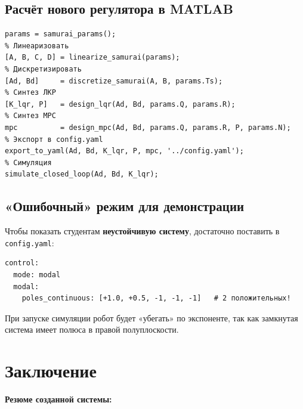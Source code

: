 \subsection{Расчёт нового регулятора в MATLAB}

\begin{filebox}[title={\filepath{matlab/main.m} --- сценарий}]
\begin{lstlisting}[style=matlabstyle]
% Загрузить параметры объекта
params = samurai_params();
% Линеаризовать
[A, B, C, D] = linearize_samurai(params);
% Дискретизировать
[Ad, Bd]     = discretize_samurai(A, B, params.Ts);
% Синтез ЛКР
[K_lqr, P]   = design_lqr(Ad, Bd, params.Q, params.R);
% Синтез MPC
mpc          = design_mpc(Ad, Bd, params.Q, params.R, P, params.N);
% Экспорт в config.yaml
export_to_yaml(Ad, Bd, K_lqr, P, mpc, '../config.yaml');
% Симуляция
simulate_closed_loop(Ad, Bd, K_lqr);
\end{lstlisting}
\end{filebox}

\subsection{«Ошибочный» режим для демонстрации}

Чтобы показать студентам \textbf{неустойчивую систему}, достаточно
поставить в \texttt{config.yaml}:
\begin{filebox}[title={Демонстрация неустойчивости}]
\begin{lstlisting}[basicstyle=\small\ttfamily]
control:
  mode: modal
  modal:
    poles_continuous: [+1.0, +0.5, -1, -1, -1]   # 2 положительных!
\end{lstlisting}
\end{filebox}

При запуске симуляции робот будет «убегать» по экспоненте,
так как замкнутая система имеет полюса в правой полуплоскости.

\section{Заключение}
\label{sec:conclusion}

\textbf{Резюме созданной системы:}

